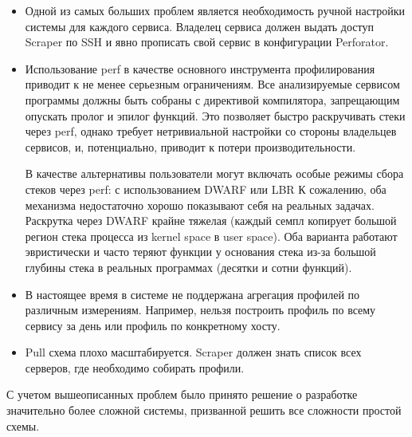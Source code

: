 \begin{itemize}
    \item
        Одной из самых больших проблем является необходимость ручной настройки системы для каждого сервиса.
        Владелец сервиса должен выдать доступ Scraper по SSH и явно прописать свой сервис в конфигурации Perforator.

    \item
        Использование perf в качестве основного инструмента профилирования приводит к не менее серьезным ограничениям.
        Все анализируемые сервисом программы должны быть собраны с директивой компилятора, запрещающим опускать пролог и эпилог функций.
        Это позволяет быстро раскручивать стеки через perf, однако требует нетривиальной настройки со стороны владельцев сервисов, и,
        потенциально, приводит к потери производительности.

        В качестве альтернативы пользователи могут включать особые режимы сбора стеков через perf: с использованием DWARF или
        LBR 
        К сожалению, оба механизма недостаточно хорошо показывают себя на реальных задачах.
        Раскрутка через DWARF крайне тяжелая (каждый семпл копирует большой регион стека процесса из kernel space в user space).
        Оба варианта работают эвристически и часто теряют функции у основания стека из-за большой глубины стека в реальных программах
        (десятки и сотни функций).

    \item
        В настоящее время в системе не поддержана агрегация профилей по различным измерениям.
        Например, нельзя построить профиль по всему сервису за день или профиль по конкретному хосту.

    \item
        Pull схема плохо масштабируется. Scraper должен знать список всех серверов, где необходимо собирать профили.
\end{itemize}

С учетом вышеописанных проблем было принято решение о разработке значительно более сложной системы, призванной решить
все сложности простой схемы.
